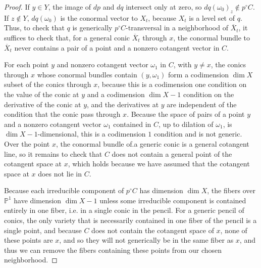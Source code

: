 \begin{proof}
If $y\in Y$, the image of $dp$ and $dq$ intersect only at zero, so $dq(\omega_0)_z \notin p^\circ C$. If $z\notin Y$,  $dq(\omega_0 )$ is the conormal vector to  $X_t$, because $X_t$ is a level set of $q$. Thus, to check that  $q$ is generically $p^\circ C$-transversal in a neighborhood of $\overline{X}_t$, it suffices to check that, for a general conic $\overline{X}_t$ through $x$, the conormal bundle to $\overline{X}_t$ never contains a pair of a point and a nonzero cotangent vector in $C$.

For each point $y$ and nonzero cotangent vector $\omega_1$ in $C$, with $y\neq x$, the conics through $x$ whose conormal bundles contain $(y, \omega_1)$ form a codimension $\dim X$ subset of the conics through $x$, because this is a codimension one condition on the value of the conic at $y$ and a codimension $\dim X-1$ condition on the derivative of the conic at $y$, and the derivatives at $y$ are independent of the condition that the conic pass through $x$. Because the space of pairs of a point $y$ and a nonzero cotangent vector $\omega_1$ contained in $C$, up to dilation of $\omega_1$, is $\dim X-1$-dimensional, this is a codimension $1$ condition and is not generic. Over the point $x$, the conormal bundle of.a generic conic is a general cotangent line, so it remains to check that $C$ does not contain a general point of the cotangent space at $x$, which holds because we have assumed that the cotangent space at $x$ does not lie in $C$.

Because each irreducible component of $p^\circ C$ has dimension $\dim X$, the fibers over $\mathbb P^1$ have dimension $\dim X -1$ unless some irreducible component is contained entirely in one fiber, i.e. in a single conic in the pencil.  For a generic pencil of conics, the only variety that is necessarily contained in one fiber of the pencil is a single point, and because $C$ does not contain the cotangent space of $x$, none of these points are $x$, and so they will not generically be in the same fiber as $x$, and thus we can remove the fibers containing these points from our chosen neighborhood.
\end{proof}

